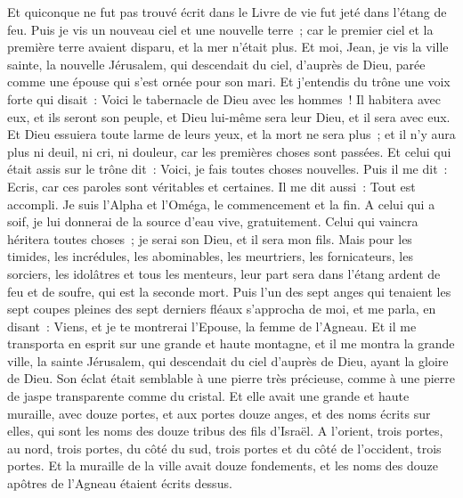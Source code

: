 \begin{multicols}{2}
Et quiconque ne fut pas trouvé écrit dans le Livre de vie fut jeté dans l'étang de feu.
\VerseOne{}Puis je vis un nouveau ciel et une nouvelle terre~; car le premier ciel et la première terre avaient disparu, et la mer n'était plus.
Et moi, Jean, je vis la ville sainte, la nouvelle Jérusalem, qui descendait du ciel, d'auprès de Dieu, parée comme une épouse qui s'est ornée pour son mari.
Et j'entendis du trône une voix forte qui disait~: Voici le tabernacle de Dieu avec les hommes~! Il habitera avec eux, et ils seront son peuple, et Dieu lui-même sera leur Dieu, et il sera avec eux.
Et Dieu essuiera toute larme de leurs yeux, et la mort ne sera plus~; et il n'y aura plus ni deuil, ni cri, ni douleur, car les premières choses sont passées.
Et celui qui était assis sur le trône dit~: Voici, je fais toutes choses nouvelles. Puis il me dit~: Ecris, car ces paroles sont véritables et certaines.
Il me dit aussi~: Tout est accompli. Je suis l'Alpha et l'Oméga, le commencement et la fin. A celui qui a soif, je lui donnerai de la source d'eau vive, gratuitement.
Celui qui vaincra héritera toutes choses~; je serai son Dieu, et il sera mon fils.
Mais pour les timides, les incrédules, les abominables, les meurtriers, les fornicateurs, les sorciers, les idolâtres et tous les menteurs, leur part sera dans l'étang ardent de feu et de soufre, qui est la seconde mort.
Puis l'un des sept anges qui tenaient les sept coupes pleines des sept derniers fléaux s'approcha de moi, et me parla, en disant~: Viens, et je te montrerai l'Epouse, la femme de l'Agneau.
Et il me transporta en esprit sur une grande et haute montagne, et il me montra la grande ville, la sainte Jérusalem, qui descendait du ciel d'auprès de Dieu,
ayant la gloire de Dieu. Son éclat était semblable à une pierre très précieuse, comme à une pierre de jaspe transparente comme du cristal.
Et elle avait une grande et haute muraille, avec douze portes, et aux portes douze anges, et des noms écrits sur elles, qui sont les noms des douze tribus des fils d'Israël.
A l'orient, trois portes, au nord, trois portes, du côté du sud, trois portes et du côté de l'occident, trois portes.
Et la muraille de la ville avait douze fondements, et les noms des douze apôtres de l'Agneau étaient écrits dessus.

\end{multicols}
